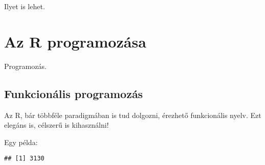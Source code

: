 \documentclass[
]{book}
\newenvironment{Shaded}{\begin{snugshade}}{\end{snugshade}}
\newcommand{\ControlFlowTok}[1]{\textcolor[rgb]{0.13,0.29,0.53}{\textbf{#1}}}
\newcommand{\DecValTok}[1]{\textcolor[rgb]{0.00,0.00,0.81}{#1}}
\newcommand{\KeywordTok}[1]{\textcolor[rgb]{0.13,0.29,0.53}{\textbf{#1}}}
\newcommand{\NormalTok}[1]{#1}
\newcommand{\OperatorTok}[1]{\textcolor[rgb]{0.81,0.36,0.00}{\textbf{#1}}}
\newcommand{\StringTok}[1]{\textcolor[rgb]{0.31,0.60,0.02}{#1}}
\begin{document}
Ilyet is lehet.

\hypertarget{az-r-programozuxe1sa}{%
\chapter{Az R programozása}\label{az-r-programozuxe1sa}}

Programozás.

\hypertarget{funkcionuxe1lis-programozuxe1s}{%
\section{Funkcionális programozás}\label{funkcionuxe1lis-programozuxe1s}}

Az R, bár többféle paradigmában is tud dolgozni, érezhető funkcionális nyelv. Ezt elegáns is, célszerű is kihasználni!

Egy példa:

\begin{Shaded}
\end{Shaded}

\begin{verbatim}
## [1] 3130
\end{verbatim}

\begin{Shaded}
\end{Shaded}
\end{document}

